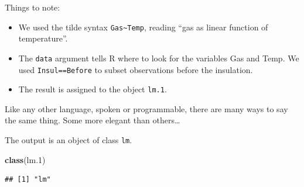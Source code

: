 \documentclass[]{book}
\newenvironment{Shaded}{\begin{snugshade}}{\end{snugshade}}
\newcommand{\DataTypeTok}[1]{\textcolor[rgb]{0.13,0.29,0.53}{#1}}
\newcommand{\FloatTok}[1]{\textcolor[rgb]{0.00,0.00,0.81}{#1}}
\newcommand{\KeywordTok}[1]{\textcolor[rgb]{0.13,0.29,0.53}{\textbf{#1}}}
\newcommand{\NormalTok}[1]{#1}
\newcommand{\OperatorTok}[1]{\textcolor[rgb]{0.81,0.36,0.00}{\textbf{#1}}}
\newcommand{\StringTok}[1]{\textcolor[rgb]{0.31,0.60,0.02}{#1}}
\providecommand{\tightlist}{%
  \setlength{\itemsep}{0pt}\setlength{\parskip}{0pt}}
\theoremstyle{definition}
\theoremstyle{definition}
\theoremstyle{definition}
\theoremstyle{remark}
\begin{document}
Things to note:

\begin{itemize}
\tightlist
\item
  We used the tilde syntax \texttt{Gas\textasciitilde{}Temp}, reading ``gas as linear function of temperature''.
\item
  The \texttt{data} argument tells R where to look for the variables Gas and Temp.
  We used \texttt{Insul==\textquotesingle{}Before\textquotesingle{}} to subset observations before the insulation.
\item
  The result is assigned to the object \texttt{lm.1}.
\end{itemize}

Like any other language, spoken or programmable, there are many ways to say the same thing. Some more elegant than others\ldots{}

\begin{Shaded}
\end{Shaded}

The output is an object of class \texttt{lm}.

\begin{Shaded}
\begin{Highlighting}[]
\KeywordTok{class}\NormalTok{(lm}\FloatTok{.1}\NormalTok{)}
\end{Highlighting}
\end{Shaded}

\begin{verbatim}
## [1] "lm"
\end{verbatim}
\end{document}
